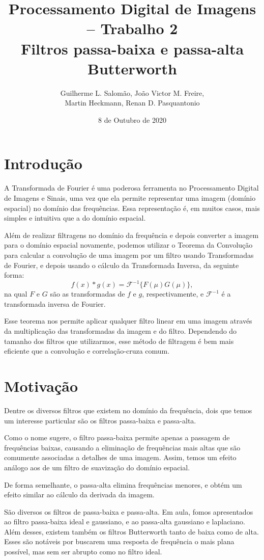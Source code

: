 \documentclass[12pt,a4paper]{article}
\title{Processamento Digital de Imagens – Trabalho 2\\Filtros passa-baixa e passa-alta Butterworth}
\author{Guilherme L. Salomão, João Victor M. Freire, \\Martin Heckmann, Renan D. Pasquantonio }
\date{8 de Outubro de 2020}
\begin{document}
\maketitle

\section{Introdução}
A Transformada de Fourier é uma poderosa ferramenta no Processamento Digital de Imagens e Sinais, uma vez que ela permite representar uma imagem (domínio espacial) no domínio das frequências. Essa representação é, em muitos casos, mais simples e intuitiva que a do domínio espacial.

Além de realizar filtragens no domínio da frequência e depois converter a imagem para o domínio espacial novamente, podemos utilizar o Teorema da Convolução para calcular a convolução de uma imagem por um filtro usando Transformadas de Fourier, e depois usando o cálculo da Transformada Inversa, da seguinte forma:
$$
 f(x) * g(x) = \mathscr{F}^{-1}\{F(\mu)G(\mu)\},
$$
na qual $F$ e $G$ são as transformadas de $f$ e $g$, respectivamente, e $\mathscr{F}^{-1}$ é a transformada inversa de Fourier.

Esse teorema nos permite aplicar qualquer filtro linear em uma imagem através da multiplicação das transformadas da imagem e do filtro. Dependendo do tamanho dos filtros que utilizarmos, esse método de filtragem é bem mais eficiente que a convolução e correlação-cruza comum.

\section{Motivação}
Dentre os diversos filtros que existem no domínio da frequência, dois que temos um interesse particular são os filtros passa-baixa e passa-alta.

Como o nome sugere, o filtro passa-baixa permite apenas a passagem de frequências baixas, causando a eliminação de frequências mais altas que são comumente associadas a detalhes de uma imagem. Assim, temos um efeito análogo aos de um filtro de suavização do domínio espacial.

De forma semelhante, o passa-alta elimina frequências menores, e obtém um efeito similar ao cálculo da derivada da imagem.

São diversos os filtros de passa-baixa e passa-alta. Em aula, fomos apresentados ao filtro passa-baixa ideal e gaussiano, e ao passa-alta gaussiano e laplaciano. Além desses, existem também os filtros Butterworth tanto de baixa como de alta. Esses são notáveis por buscarem uma resposta de frequência o mais plana possível, mas sem ser abrupto como no filtro ideal.
\end{document}
